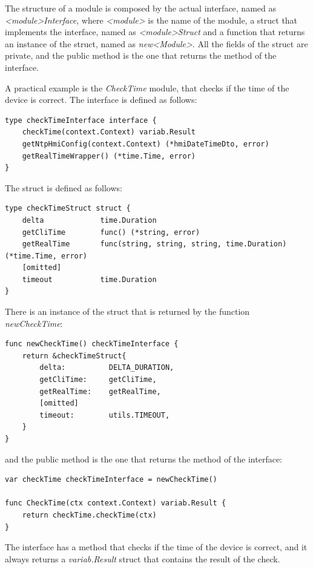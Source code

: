 The structure of a module is composed by the actual interface, named as \textit{<module>Interface}, where \textit{<module>} is the name of the module, a struct that implements the interface, named as \textit{<module>Struct} and a function that returns an instance of the struct, named as \textit{new<Module>}.
All the fields of the struct are private, and the public method is the one that returns the method of the interface.

A practical example is the \textit{CheckTime} module, that checks if the time of the device is correct. The interface is defined as follows:

\begin{lstlisting}[style=golang]
type checkTimeInterface interface {
	checkTime(context.Context) variab.Result
	getNtpHmiConfig(context.Context) (*hmiDateTimeDto, error)
	getRealTimeWrapper() (*time.Time, error)
}
\end{lstlisting}

The struct is defined as follows:

\begin{lstlisting}[style=golang]
type checkTimeStruct struct {
	delta             time.Duration
	getCliTime        func() (*string, error)
	getRealTime       func(string, string, string, time.Duration) (*time.Time, error)
	[omitted]
	timeout           time.Duration
}
\end{lstlisting}

There is an instance of the struct that is returned by the function \textit{newCheckTime}:

\begin{lstlisting}[style=golang]
func newCheckTime() checkTimeInterface {
	return &checkTimeStruct{
		delta:          DELTA_DURATION,
		getCliTime:     getCliTime,
		getRealTime:    getRealTime,
		[omitted]
		timeout:        utils.TIMEOUT,
	}
}
\end{lstlisting}

and the public method is the one that returns the method of the interface:

\begin{lstlisting}[style=golang]
var checkTime checkTimeInterface = newCheckTime()

func CheckTime(ctx context.Context) variab.Result {
	return checkTime.checkTime(ctx)
}
\end{lstlisting}

The interface has a method that checks if the time of the device is correct, and it always returns a \textit{variab.Result} struct that contains the result of the check.

